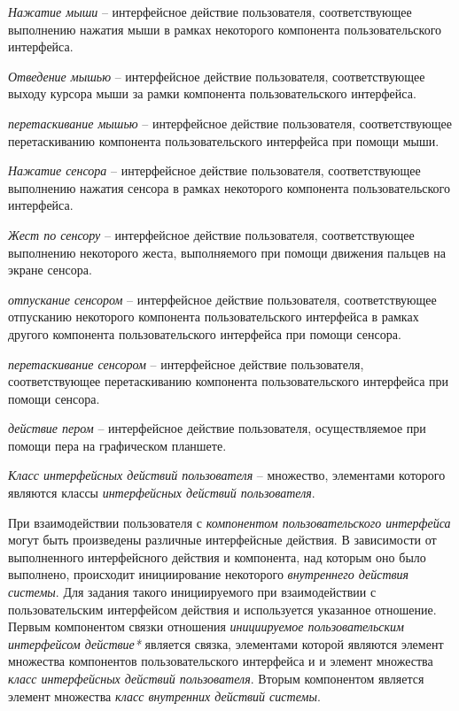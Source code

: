 \textit{Нажатие мыши} -- интерфейсное действие пользователя, соответствующее выполнению нажатия мыши в рамках некоторого компонента пользовательского интерфейса.

\textit{Отведение мышью} -- интерфейсное действие пользователя, соответствующее выходу курсора мыши за рамки компонента пользовательского интерфейса.

\textit{перетаскивание мышью} -- интерфейсное действие пользователя, соответствующее перетаскиванию компонента пользовательского интерфейса при помощи мыши.

\textit{Нажатие сенсора} -- интерфейсное действие пользователя, соответствующее выполнению нажатия сенсора в рамках некоторого компонента пользовательского интерфейса.

\textit{Жест по сенсору} -- интерфейсное действие пользователя, соответствующее выполнению некоторого жеста, выполняемого при помощи движения пальцев на экране сенсора.

\textit{отпускание сенсором} -- интерфейсное действие пользователя, соответствующее отпусканию некоторого компонента пользовательского интерфейса в рамках другого компонента пользовательского интерфейса при помощи сенсора.

\textit{перетаскивание сенсором} -- интерфейсное действие пользователя, соответствующее перетаскиванию компонента пользовательского интерфейса при помощи сенсора.

\textit{действие пером} -- интерфейсное действие пользователя, осуществляемое при помощи пера на графическом планшете.

\textit{Класс интерфейсных действий пользователя} -- множество, элементами которого являются классы \textit{интерфейсных действий пользователя}.

При взаимодействии пользователя с \textit{компонентом пользовательского интерфейса} могут быть произведены различные интерфейсные действия. В зависимости от выполненного интерфейсного действия и компонента, над которым оно было выполнено, происходит инициирование некоторого \textit{внутреннего действия системы}. Для задания такого инициируемого при взаимодействии с пользовательским интерфейсом действия и используется указанное отношение. Первым компонентом связки отношения \textit{инициируемое пользовательским интерфейсом действие*} является связка, элементами которой являются элемент множества компонентов пользовательского интерфейса и и элемент множества \textit{класс интерфейсных действий пользователя}. Вторым компонентом является элемент множества \textit{класс внутренних действий системы}.


